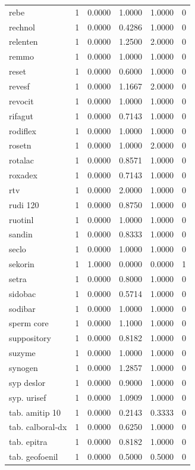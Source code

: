 \begin{longtable}{p{3.0cm}rrrrr}
rebe & 1 & 0.0000 & 1.0000 & 1.0000 & 0 \\
rechnol & 1 & 0.0000 & 0.4286 & 1.0000 & 0 \\
relenten & 1 & 0.0000 & 1.2500 & 2.0000 & 0 \\
remmo & 1 & 0.0000 & 1.0000 & 1.0000 & 0 \\
reset & 1 & 0.0000 & 0.6000 & 1.0000 & 0 \\
revesf & 1 & 0.0000 & 1.1667 & 2.0000 & 0 \\
revocit & 1 & 0.0000 & 1.0000 & 1.0000 & 0 \\
rifagut & 1 & 0.0000 & 0.7143 & 1.0000 & 0 \\
rodiflex & 1 & 0.0000 & 1.0000 & 1.0000 & 0 \\
rosetn & 1 & 0.0000 & 1.0000 & 2.0000 & 0 \\
rotalac & 1 & 0.0000 & 0.8571 & 1.0000 & 0 \\
roxadex & 1 & 0.0000 & 0.7143 & 1.0000 & 0 \\
rtv & 1 & 0.0000 & 2.0000 & 1.0000 & 0 \\
rudi 120 & 1 & 0.0000 & 0.8750 & 1.0000 & 0 \\
ruotinl & 1 & 0.0000 & 1.0000 & 1.0000 & 0 \\
sandin & 1 & 0.0000 & 0.8333 & 1.0000 & 0 \\
seclo & 1 & 0.0000 & 1.0000 & 1.0000 & 0 \\
sekorin & 1 & 1.0000 & 0.0000 & 0.0000 & 1 \\
setra & 1 & 0.0000 & 0.8000 & 1.0000 & 0 \\
sidobac & 1 & 0.0000 & 0.5714 & 1.0000 & 0 \\
sodibar & 1 & 0.0000 & 1.0000 & 1.0000 & 0 \\
sperm core & 1 & 0.0000 & 1.1000 & 1.0000 & 0 \\
suppository & 1 & 0.0000 & 0.8182 & 1.0000 & 0 \\
suzyme & 1 & 0.0000 & 1.0000 & 1.0000 & 0 \\
synogen & 1 & 0.0000 & 1.2857 & 1.0000 & 0 \\
syp deslor & 1 & 0.0000 & 0.9000 & 1.0000 & 0 \\
syp. urisef & 1 & 0.0000 & 1.0909 & 1.0000 & 0 \\
tab. amitip 10 & 1 & 0.0000 & 0.2143 & 0.3333 & 0 \\
tab. calboral-dx & 1 & 0.0000 & 0.6250 & 1.0000 & 0 \\
tab. epitra & 1 & 0.0000 & 0.8182 & 1.0000 & 0 \\
tab. geofoenil & 1 & 0.0000 & 0.5000 & 0.5000 & 0 \\

\end{longtable}
